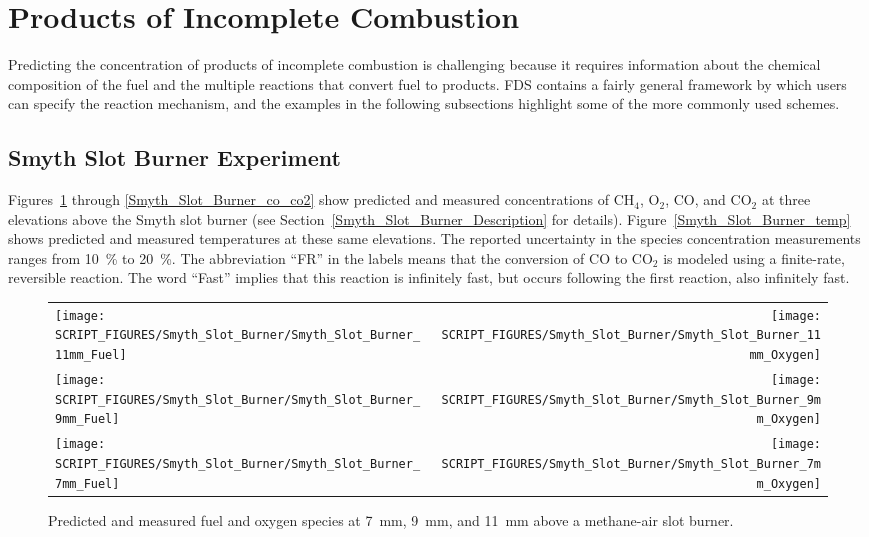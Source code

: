 \clearpage

\section{Products of Incomplete Combustion}

Predicting the concentration of products of incomplete combustion is challenging because it requires information about the chemical composition of the fuel and the multiple reactions that convert fuel to products. FDS contains a fairly general framework by which users can specify the reaction mechanism, and the examples in the following subsections highlight some of the more commonly used schemes.


\subsection{Smyth Slot Burner Experiment}
\label{Smyth_Reactions}

Figures~\ref{Smyth_Slot_Burner_fuel_ox} through \ref{Smyth_Slot_Burner_co_co2} show predicted and measured concentrations of CH$_4$, O$_2$, CO,  and CO$_2$ at three elevations above the Smyth slot burner (see Section~\ref{Smyth_Slot_Burner_Description} for details). Figure~\ref{Smyth_Slot_Burner_temp} shows predicted and measured temperatures at these same elevations.  The reported uncertainty in the species concentration measurements ranges from 10~\% to 20~\%. The abbreviation ``FR'' in the labels means that the conversion of CO to CO$_2$ is modeled using a finite-rate, reversible reaction. The word ``Fast'' implies that this reaction is infinitely fast, but occurs following the first reaction, also infinitely fast.

\begin{figure}[p]
\begin{tabular*}{\textwidth}{l@{\extracolsep{\fill}}r}
\texttt{[image: SCRIPT\_FIGURES/Smyth\_Slot\_Burner/Smyth\_Slot\_Burner\_11mm\_Fuel]} &
\texttt{[image: SCRIPT\_FIGURES/Smyth\_Slot\_Burner/Smyth\_Slot\_Burner\_11mm\_Oxygen]} \\
\texttt{[image: SCRIPT\_FIGURES/Smyth\_Slot\_Burner/Smyth\_Slot\_Burner\_9mm\_Fuel]} &
\texttt{[image: SCRIPT\_FIGURES/Smyth\_Slot\_Burner/Smyth\_Slot\_Burner\_9mm\_Oxygen]} \\
\texttt{[image: SCRIPT\_FIGURES/Smyth\_Slot\_Burner/Smyth\_Slot\_Burner\_7mm\_Fuel]} &
\texttt{[image: SCRIPT\_FIGURES/Smyth\_Slot\_Burner/Smyth\_Slot\_Burner\_7mm\_Oxygen]}
\end{tabular*}
\caption[Species predictions at 7~mm, 9~mm, and 11~mm above burner, Smyth experiment]
{Predicted and measured fuel and oxygen species at 7~mm, 9~mm, and 11~mm above a methane-air slot burner.}
\label{Smyth_Slot_Burner_fuel_ox}
\end{figure}

